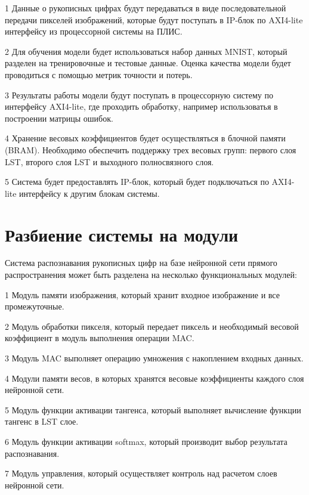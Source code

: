   1 Данные о рукописных цифрах будут передаваться в виде последовательной 
передачи пикселей изображений, которые будут поступать в IP-блок по AXI4-lite 
интерфейсу из процессорной системы на ПЛИС.
    
  2 Для обучения модели будет использоваться набор данных MNIST, который 
разделен на тренировочные и тестовые данные. Оценка качества модели будет 
проводиться с помощью метрик точности и потерь. 
    
  3 Результаты работы модели будут поступать в процессорную систему по 
интерфейсу AXI4-lite, где проходить обработку, например использоватья в 
построении матрицы ошибок.
    
  4 Хранение весовых коэффициентов будет осуществляться в блочной памяти 
(BRAM). Необходимо обеспечить поддержку трех весовых групп: первого слоя LST, 
второго слоя LST и выходного полносвязного слоя.
    
  5 Система будет предоставлять IP-блок, который будет подключаться по 
AXI4-lite интерфейсу к другим блокам системы.

\section{Разбиение системы на модули}\par
\hspace*{12.5 mm}Система распознавания рукописных цифр на базе нейронной сети 
прямого распространения может быть разделена на несколько функциональных 
модулей:

  1 Модуль памяти изображения, который хранит входное изображение и все 
промежуточные. 

  2 Модуль обработки пикселя, который передает пиксель и необходимый весовой 
коэффициент в модуль выполнения операции MAC.\@
  
  3 Модуль MAC выполняет операцию умножения с накоплением входных данных.

  4 Модули памяти весов, в которых хранятся весовые коэффициенты каждого слоя 
нейронной сети.

  5 Модуль функции активации тангенса, который выполняет вычисление функции 
тангенс в LST слое.

  6 Модуль функции активации softmax, который производит выбор результата 
распознавания.

  7 Модуль управления, который осуществляет контроль над расчетом слоев 
нейронной сети.

